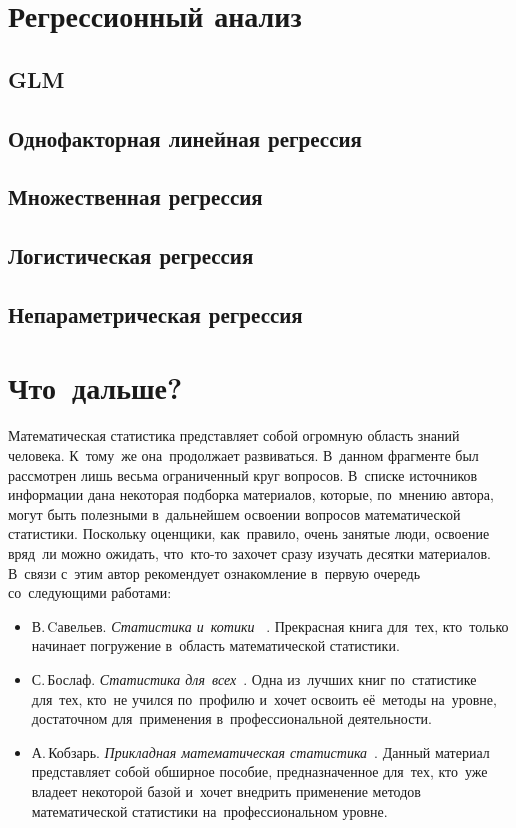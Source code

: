 \documentclass[]{scrartcl}
\begin{document}
\section{Регрессионный анализ}

\subsection{GLM}

\subsection{Однофакторная линейная регрессия}

\subsection{Множественная регрессия}

\subsection{Логистическая регрессия}

\subsection{Непараметрическая регрессия}







\section{Что~дальше?}
Математическая статистика представляет собой огромную область знаний человека. К~тому~же она~продолжает развиваться. В~данном фрагменте был рассмотрен лишь весьма ограниченный круг вопросов. В~списке источников информации дана некоторая подборка материалов, которые, по~мнению автора, могут быть полезными в~дальнейшем освоении вопросов математической статистики. Поскольку оценщики, как~правило, очень занятые люди, освоение вряд~ли можно ожидать, что~кто-то захочет сразу изучать десятки материалов. В~связи с~этим автор рекомендует ознакомление в~первую очередь со~следующими работами:
	\begin{itemize}
		\item В.\,Cавельев. \emph{Статистика и~котики} ~\cite{Statistika-i-kotiki}. Прекрасная книга для~тех, кто~только начинает погружение в~область математической статистики.
		\item С.\,Бослаф. \emph{Статистика для~всех}~\cite{Statistika-dlya-vsex}. Одна из~лучших книг по~статистике для~тех, кто~не учился по~профилю и~хочет освоить её~методы на~уровне, достаточном для~применения в~профессиональной деятельности.
		\item А.\,Кобзарь. \emph{Прикладная математическая статистика}~\cite{Kobzarq-prikl-mathstat}. Данный материал представляет собой обширное пособие, предназначенное для~тех, кто~уже владеет некоторой базой и~хочет внедрить применение методов математической статистики на~профессиональном уровне.     
	\end{itemize}  
\end{document}

